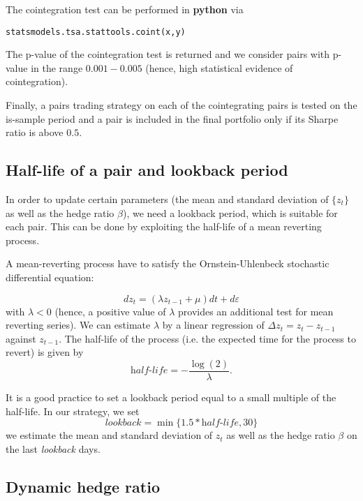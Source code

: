 \documentclass{paper}
\begin{document}
The cointegration test can be performed in \textbf{python} via
\begin{lstlisting}
statsmodels.tsa.stattools.coint(x,y)
\end{lstlisting}

The p-value of the cointegration test is returned and we consider pairs with p-value in the range $0.001-0.005$ (hence, high statistical evidence of cointegration).

Finally, a pairs trading strategy on each of the cointegrating pairs is tested on the is-sample period and a pair is included in the final portfolio only if its Sharpe ratio is above $0.5.$

\subsection{Half-life of a pair and lookback period}

In order to update certain parameters (the mean and standard deviation of $\{z_t\}$ as well as the hedge ratio $\beta$), we need a lookback period, which is suitable for each pair. This can be done by exploiting the half-life of a mean reverting process.

A mean-reverting process have to satisfy the Ornstein-Uhlenbeck stochastic differential equation:

\begin{displaymath}
dz_t = (\lambda z_{t-1} + \mu)dt + d \varepsilon
\end{displaymath}
with $\lambda < 0$ (hence, a positive value of $\lambda$ provides an additional test for mean reverting series). We can estimate $\lambda$ by a linear regression of $\Delta z_t = z_t - z_{t-1}$ against $z_{t-1}.$ The half-life of the process (i.e. the expected time for the process to revert) is given by
\begin{displaymath}
\textit{half-life} = -\frac{\log(2)}{\lambda}.
\end{displaymath}

It is a good practice to set a lookback period equal to a small multiple of the half-life. In our strategy, we set
\begin{displaymath}
\textit{lookback} = \min\{1.5*\textit{half-life}, 30\}
\end{displaymath}
we estimate the mean and standard deviation of $z_t$ as well as the hedge ratio $\beta$ on the last \textit{lookback} days.

\subsection{Dynamic hedge ratio}
\end{document}

